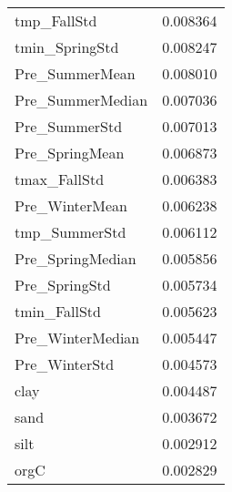 \begin{tabular}{lr}
tmp_FallStd & 0.008364 \\
tmin_SpringStd & 0.008247 \\
Pre_SummerMean & 0.008010 \\
Pre_SummerMedian & 0.007036 \\
Pre_SummerStd & 0.007013 \\
Pre_SpringMean & 0.006873 \\
tmax_FallStd & 0.006383 \\
Pre_WinterMean & 0.006238 \\
tmp_SummerStd & 0.006112 \\
Pre_SpringMedian & 0.005856 \\
Pre_SpringStd & 0.005734 \\
tmin_FallStd & 0.005623 \\
Pre_WinterMedian & 0.005447 \\
Pre_WinterStd & 0.004573 \\
clay & 0.004487 \\
sand & 0.003672 \\
silt & 0.002912 \\
orgC & 0.002829 \\
\bottomrule
\end{tabular}
